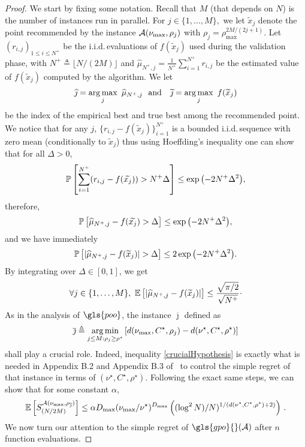 \begin{proof} 
We start by fixing some notation. Recall that $M$ (that depends on $N$) is the number of instances run in parallel. For $j \in \{1,\dots,M\},$ we let $\tilde{x}_j$ denote the point recommended by the instance $\mathcal{A}(\nu_{\max},\rho_{j})$ with $\rho_j = \rho_{\max}^{2M/(2j+1)}$. Let $(r_{i,j})_{1 \leq i \leq N^+}$ be the i.i.d.\,evaluations of $f(\tilde{x}_j)$ used during the validation phase, with $N^+ \triangleq \lfloor N/(2M)\rfloor$ and $\hat{\mu}_{N^+,j} = \frac{1}{N^+}\sum_{i=1}^{N^+} r_{i,j}$ be the estimated value of $f(\tilde{x}_j)$ computed by the algorithm. We let \[\hat{\jmath} = \argmax_j \ \hat{\mu}_{N^+,j} \ \ \text{and} \ \ \ \tilde{\jmath} = \argmax_j \ f(\tilde{x}_j)\] 
be the index of the empirical best and true best among the recommended point. 
We notice that for any $j$, $\{r_{i,j}-f(\tilde{x}_{j})\}_{i=1}^{N^+}$ is a bounded i.i.d.\,sequence with zero mean (conditionally to $\tilde{x}_j$) thus using Hoeffding's inequality one can show that for all $\Delta > 0$,
\[
    \mathbb{P}\left[\sum_{i=1}^{N^+}(r_{i,j}-f(\widetilde{x_{j}})) > N^+\Delta\right] \leq \exp{\left(-2N^+\Delta^2\right)},
\]
therefore,
\[
    \mathbb{P}\left[\widehat{\mu}_{N^+,j}-f(\widetilde{x_{j}}) > \Delta\right] \leq \exp{\left(-2N^+\Delta^2\right)},
\]
and we have immediately
\[
    \mathbb{P}\left[\lvert\widehat{\mu}_{N^+,j}-f(\widetilde x_{j})\rvert > \Delta\right] \leq 2\exp{\left(-2N^+\Delta^2\right)}.
\]
By integrating over $\Delta\in [0,1]$, we get
\begin{equation}\label{eq:azuma}
    \forall j\in \{1,\dots,M\}, \ \EE{\abs{\hat{\mu}_{N^+,j}-f(\tilde{x}_{j})}} \leq \frac{\sqrt{\pi/2}}{\sqrt{N^+}}\cdot
\end{equation}
As in the analysis of $\gls{poo}$, the instance $\overline{\jmath}$ defined as   
\[
	\overline{\jmath} \triangleq \underset{j \leq M : \rho_j\geq\rho^\star}{\operatorname*{arg\,min}} \left[d(\nu_{\max},C^\star,\rho_j) - d(\nu^\star,C^\star,\rho^\star)\right]
\]
shall play a crucial role. Indeed, inequality \eqref{crucialHypothesis} is exactly what is needed in Appendix B.2 and Appendix B.3 of~\cite{grill2015poo} to control the simple regret of that instance in terms of $(\nu^\star,C^\star,\rho^\star)$. Following the exact same steps, we can show that for some constant $\alpha$, 
\begin{equation}\label{eq:regretjbar}
    \mathbb{E}\left[S_{(N/2M)}^{\mathcal{A}(\nu_{\max},\rho_{\overline{\jmath}})}\right]  \leq \alpha D_{\max}(\nu_{\max}/\nu^\star)^{D_{\max}} \left( (\log^2 N)/N)^{1/(d(\nu^\star, C^\star,\rho^\star)+2)} \right)\,.
\end{equation} 
We now turn our attention to the simple regret of $\gls{gpo}{}(\cA)$ after $n$ function evaluations.

\end{proof}
